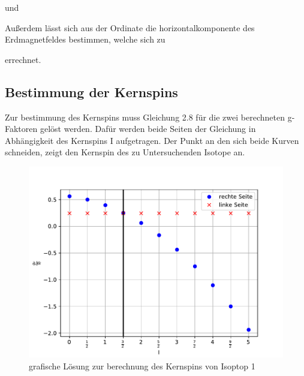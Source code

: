 

und



Außerdem lässt sich aus der Ordinate die horizontalkomponente des Erdmagnetfeldes bestimmen,
welche sich zu



errechnet.

\subsection{Bestimmung der Kernspins}
Zur bestimmung des Kernspins muss Gleichung 2.8 für die zwei berechneten g-Faktoren gelöst werden. Dafür werden beide Seiten der Gleichung in Abhängigkeit
des Kernspins I aufgetragen. Der Punkt an den sich beide Kurven schneiden, zeigt den Kernspin des zu Untersuchenden Isotope an.

\begin{figure}[H]
\centering
\includegraphics[scale=0.8]{./optischesPumpen/img/coreSpin1.pdf}
\caption{grafische Lösung zur berechnung des Kernspins von Isoptop 1}
\label{LandeIso1}
\end{figure}

